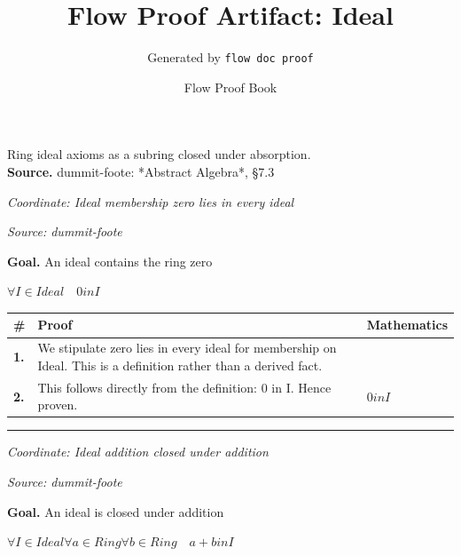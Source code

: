 \documentclass[11pt]{article}
\title{Flow Proof Artifact: Ideal}
\author{Generated by \texttt{flow doc proof}}
\date{Flow Proof Book}
\theoremstyle{definition}
\begin{document}
\maketitle
Ring ideal axioms as a subring closed under absorption.\\[0.5em]
\textbf{Source.} dummit-foote: *Abstract Algebra*, §7.3\\[0.5em]
\bigskip
{}\par
\smallskip\noindent\textit{Coordinate: Ideal \cdot membership \cdot zero lies in every ideal}\par
\smallskip\noindent\textit{Source: dummit-foote}\par
\medskip
\noindent\textbf{Goal.} An ideal contains the ring zero\par
\noindent$\displaystyle \forall I \in Ideal\quad 0 in I$\par
\medskip
\noindent
\begin{tabular}{@{} >{\raggedright\arraybackslash}p{} >{\raggedright\arraybackslash}p{} >{\raggedleft\arraybackslash}p{} @{}}
\textbf{\#} & \textbf{Proof} & \textbf{Mathematics} \\
\midrule
\textbf{1.} & We stipulate zero lies in every ideal for membership on Ideal. This is a definition rather than a derived fact. & \\[0.45em]
\textbf{2.} & This follows directly from the definition: 0 in I. Hence proven. & $\displaystyle 0 in I$ \\[0.45em]
\bottomrule
\end{tabular}
\label{thm:Ideal-membership-zero_lies_in_every_ideal}
\par\medskip\hrule
\bigskip
{}\par
\smallskip\noindent\textit{Coordinate: Ideal \cdot addition \cdot closed under addition}\par
\smallskip\noindent\textit{Source: dummit-foote}\par
\medskip
\noindent\textbf{Goal.} An ideal is closed under addition\par
\noindent$\displaystyle \forall I \in Ideal \forall a \in Ring \forall b \in Ring\quad a + b in I$\par
\medskip
\noindent
\end{document}
